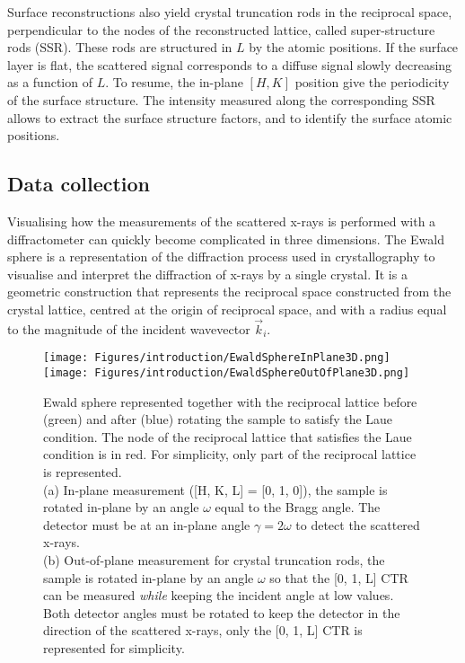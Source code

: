 Surface reconstructions also yield crystal truncation rods in the reciprocal space, perpendicular to the nodes of the reconstructed lattice, called super-structure rods (SSR).
These rods are structured in $L$ by the atomic positions.
If the surface layer is flat, the scattered signal corresponds to a diffuse signal slowly decreasing as a function of $L$.
To resume, the in-plane $[H, K]$ position give the periodicity of the surface structure.
The intensity measured along the corresponding SSR allows to extract the surface structure factors, and to identify the surface atomic positions.

\subsection{Data collection} \label{sec:DataCollectionSXRD}

Visualising how the measurements of the scattered x-rays is performed with a diffractometer can quickly become complicated in three dimensions.
The Ewald sphere is a representation of the diffraction process used in crystallography to visualise and interpret the diffraction of x-rays by a single crystal.
It is a geometric construction that represents the reciprocal space constructed from  the crystal lattice, centred at the origin of reciprocal space, and with a radius equal to the magnitude of the incident wavevector $\vec{k}_i$.

\begin{figure}[!htb]
    \centering
    \texttt{[image: Figures/introduction/EwaldSphereInPlane3D.png]}
    \texttt{[image: Figures/introduction/EwaldSphereOutOfPlane3D.png]}
    \caption{
    Ewald sphere represented together with the reciprocal lattice before (green) and after (blue) rotating the sample to satisfy the Laue condition.
    The node of the reciprocal lattice that satisfies the Laue condition is in red.
    For simplicity, only part of the reciprocal lattice is represented.\\
    (a) In-plane measurement ([H, K, L] = [0, 1, 0]), the sample is rotated in-plane by an angle $\omega$ equal to the Bragg angle.
    The detector must be at an in-plane angle $\gamma=2\omega$ to detect the scattered x-rays.\\
    (b) Out-of-plane measurement for crystal truncation rods, the sample is rotated in-plane by an angle $\omega$ so that the [0, 1, L] CTR can be measured \textit{while} keeping the incident angle at low values.
    Both detector angles must be rotated to keep the detector in the direction of the scattered x-rays, only the [0, 1, L] CTR is represented for simplicity.
    }
    \label{fig:EwaldSphere}
\end{figure}

